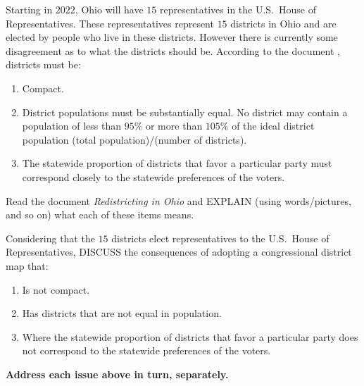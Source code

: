 \documentclass[noauthor,nooutcomes,hints,handout]{ximera}
\begin{document}
\begin{question}
  Starting in $2022$, Ohio will have $15$ representatives in the
  U.S.\ House of Representatives. These representatives represent $15$
  districts in Ohio and are elected by people who live in these
  districts. However there is currently some disagreement as to what
  the districts should be. According to the document , districts must be:
  \begin{enumerate}
  \item Compact.
  \item District populations must be substantially equal. No district
    may contain a population of less than $95\%$ or more than $105\%$
    of the ideal district population (total population)/(number of
    districts).
  \item The statewide proportion of districts that favor a particular
    party must correspond closely to the statewide preferences of the
    voters.
  \end{enumerate}
  Read the document \textit{Redistricting in Ohio} and EXPLAIN (using words/pictures, and so on) what each of these items means. 
\end{question}


\mynewpage

\begin{question}
  Considering that the $15$ districts elect representatives to the
  U.S.\ House of Representatives, DISCUSS the consequences of adopting
  a congressional district map that:
  \begin{enumerate}
  \item Is not compact.
  \item Has districts that are not equal in population.
  \item Where the statewide proportion of districts that favor a
    particular party does not correspond to the statewide preferences
    of the voters.
  \end{enumerate}
  \textbf{Address each issue above in turn, separately.} 
\end{question}
\end{document}
